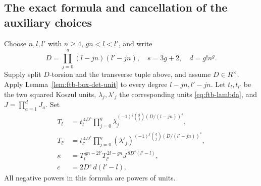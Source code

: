 \subsection{The exact formula and cancellation of the auxiliary choices}
Choose \(n,l,l'\) with \(n\geq4\), \(gn<l<l'\), and write
\[
 D=\prod_{j=0}^g(l-jn)(l'-jn),\quad s=3g+2,\quad d=g!n^g.
\]
Supply split \(D\)-torsion and the transverse tuple above, and assume
\(D\in R^\times\).  Apply
Lemma~\ref{lem:ftb-box-det-unit} to every degree \(l-jn,l'-jn\).
Let \(t_l,t_{l'}\) be the two squared Koszul units,
\(\lambda_j,\lambda'_j\) the corresponding units
\eqref{eq:ftb-lambda}, and \(J=\prod_{a=1}^dJ_a\).
Set
\[
 \begin{split}
 T_l&=t_l^{\,4D^s}
       \prod_{j=0}^g\lambda_j^{
          (-1)^j\binom gj(D/(l-jn))^s},\\
 T_{l'}&=t_{l'}^{\,4D^s}
       \prod_{j=0}^g(\lambda'_j)^{
          (-1)^j\binom gj(D/(l'-jn))^s},\\
 \kappa&=T_l^{\,gn-2l'}T_{l'}^{\,2l-gn}
                         J^{\,8D^s(l'-l)},\\
 c&=2D^s\,d(l'-l).
 \end{split}                                      \tag{K11}\label{eq:ftb-kaform}
\]
All negative powers in this formula are powers of units.

